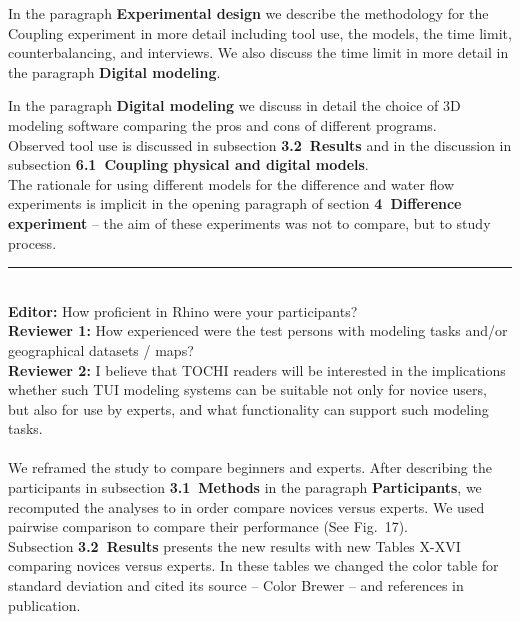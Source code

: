 \documentclass[prodmode,acmtochi]{acmsmall} %
\newcommand{\doublerule}[1][.4pt]{%
  \noindent
  \makebox[0pt][l]{\rule[.7ex]{\linewidth}{#1}}%
  \rule[.3ex]{\linewidth}{#1}}
\begin{document}
In the paragraph \textbf{Experimental design}
we describe the methodology for the Coupling experiment
in more detail including tool use, the models, 
the time limit, counterbalancing, and interviews.
We also discuss the time limit in more detail 
in the paragraph \textbf{Digital modeling}.

In the paragraph \textbf{Digital modeling}
we discuss in detail the choice of 3D modeling software
comparing the pros and cons of different programs. \\

Observed tool use is discussed in subsection \textbf{3.2~Results} and in the discussion in subsection \textbf{6.1~Coupling physical and digital models}.\\

The rationale for using different models 
for the difference and water flow experiments
is implicit in the opening paragraph of 
section \textbf{4~Difference experiment} -- 
the aim of these experiments was not to compare, 
but to study process. \\

\doublerule\\

\textbf{Editor:} How proficient in Rhino were your participants? \\

\textbf{Reviewer 1:} How experienced were the test persons with modeling tasks and/or geographical datasets / maps? \\

\textbf{Reviewer 2:} I believe that TOCHI readers will be interested in the implications whether such TUI modeling systems can be suitable not only for novice users, but also for use by experts, and what functionality can support such modeling tasks. \\

\hrulefill \\

We reframed the study to compare beginners and experts.
After describing the participants in 
subsection \textbf{3.1~Methods}
in the paragraph \textbf{Participants},
we recomputed the analyses
to in order compare novices versus experts.
We used pairwise comparison to compare their performance 
(See Fig.~17). \\

Subsection \textbf{3.2~Results} presents the new results 
with new Tables X-XVI comparing novices versus experts. 
In these tables we changed the color table for standard deviation
and cited its source -- Color Brewer -- and references in publication. \\
\end{document}

